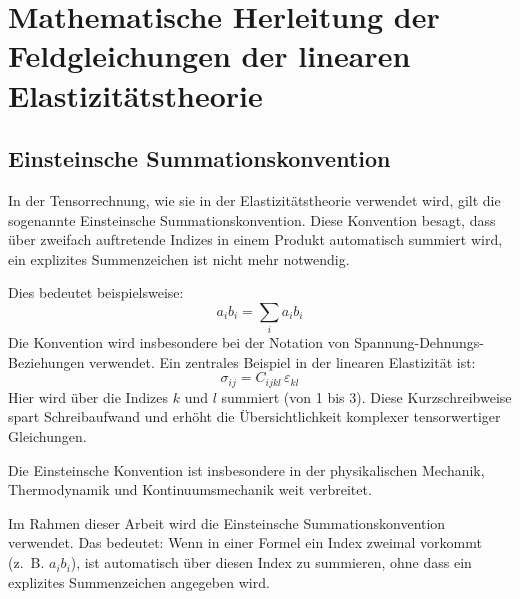 %
%
%
%
\section{Mathematische Herleitung der Feldgleichungen der linearen Elastizitätstheorie}
\label{elastomechanik:section:herleitung2}
\subsection{Einsteinsche Summationskonvention}
In der Tensorrechnung, wie sie in der Elastizitätstheorie verwendet wird, gilt die sogenannte Einsteinsche Summationskonvention. 
Diese Konvention besagt, dass über zweifach auftretende Indizes in einem Produkt automatisch summiert wird, ein explizites Summenzeichen ist nicht mehr notwendig.

Dies bedeutet beispielsweise:
	\begin{equation}
		a_i b_i = 
		\sum_i a_i b_i
	\end{equation}
Die Konvention wird insbesondere bei der Notation von Spannung-Dehnungs-Beziehungen verwendet. Ein zentrales Beispiel in der linearen Elastizität ist:
	\begin{equation}
		\sigma_{ij} = 
		C_{ijkl} \, \varepsilon_{kl}	
	\end{equation}
Hier wird über die Indizes $k$ und $l$ summiert (von 1 bis 3). 
Diese Kurzschreibweise spart Schreibaufwand und erhöht die Übersichtlichkeit komplexer tensorwertiger Gleichungen.

Die Einsteinsche Konvention ist insbesondere in der physikalischen Mechanik, Thermodynamik und Kontinuumsmechanik weit verbreitet.

Im Rahmen dieser Arbeit wird die Einsteinsche Summationskonvention verwendet. 
Das bedeutet: Wenn in einer Formel ein Index zweimal vorkommt (z.~B. $a_ib_i$), ist automatisch über diesen Index zu summieren, ohne dass ein explizites Summenzeichen angegeben wird.
